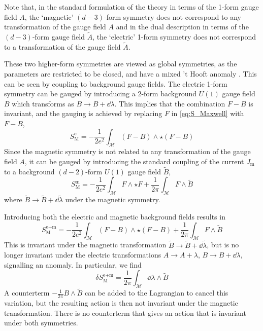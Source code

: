 Note that, in the standard formulation of the theory in terms of the 1-form gauge field $A$, the `magnetic' $(d-3)$-form symmetry does not correspond to any transformation of the gauge field $A$ and in the dual description in terms of the $(d-3)$-form gauge field $\tilde{A}$, the `electric' 1-form symmetry does not correspond to a transformation of the gauge field $\tilde{A}$.

These two higher-form symmetries are viewed as global symmetries, as the parameters are restricted to be closed, and have a mixed 't Hooft anomaly \cite{Gaiotto2015GeneralizedSymmetries}. This can be seen by coupling  to background gauge fields. The electric 1-form symmetry can be gauged by introducing a 2-form background $U(1)$ gauge field $B$ which transforms as $B \to B + \dd\lambda$. This implies that the combination $F-B$ is invariant, and the gauging is achieved by replacing $F$ in \eqref{eq:S_Maxwell} with $F-B$,
\begin{equation}\label{eq:Maxwell_electric_gauged}
    S_{\text{M}}^{\text{e}} = -\frac{1}{2e^2} \int_{\mathcal{M}} (F-B)\wedge\star(F-B)
\end{equation}
 Since the magnetic symmetry is not related to any transformation of the gauge field $A$, it can be gauged by introducing the standard coupling of the current $J_{\text{m}}$ to a background $(d-2)$-form $U(1)$ gauge field $\tilde{B}$,
\begin{equation}
    S_{\text{M}}^{\text{m}} = -\frac{1}{2e^2} \int_{\mathcal{M}} F\wedge\star F + \frac{1}{2\pi} \int_{\mathcal{M}} F \wedge \tilde{B}
\end{equation}
where $\tilde{B} \to \tilde{B} + \dd{\tilde{\lambda}}$ under the magnetic symmetry.

Introducing both the electric and magnetic background fields results in
\begin{equation}
    S_{\text{M}}^{\text{e}+\text{m}} = -\frac{1}{2e^2} \int_{\mathcal{M}} (F-B)\wedge\star(F-B) + \frac{1}{2\pi} \int_{\mathcal{M}} F \wedge \tilde{B}
\end{equation}
This is invariant under the magnetic transformation $\tilde{B} \to \tilde{B} + \dd{\tilde{\lambda}}$, but is no longer invariant under the electric transformations $A\to A+\lambda$, $B\to B+\dd{\lambda}$, signalling an anomaly. In particular, we find
\begin{equation}\label{eq:Maxwell_anomaly}
    \delta S_{\text{M}}^{\text{e}+\text{m}} = \frac{1}{2\pi} \int_{\mathcal{M}} \dd{\lambda} \wedge \tilde{B}
\end{equation}
A counterterm $-\frac{1}{2\pi} B\wedge\tilde{B}$ can be added to the Lagrangian to cancel this variation, but the resulting action is then not invariant under the magnetic transformation. 
There is no counterterm that gives an action that is invariant under both symmetries. 

